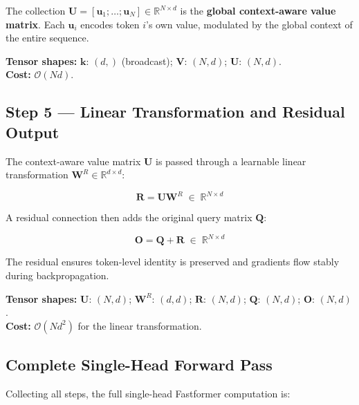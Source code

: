 \documentclass[11pt,a4paper]{article}
\newcommand{\mat}[1]{\mathbf{#1}}
\newcommand{\vect}[1]{\mathbf{#1}}
\newcommand{\R}{\mathbb{R}}
\theoremstyle{definition}
\begin{document}
The collection $\mat{U}=[\vect{u}_1;\ldots;\vect{u}_N]\in\R^{N\times d}$ is the
\textbf{global context-aware value matrix}.
Each $\vect{u}_i$ encodes token $i$'s own value, modulated by the global context of the
entire sequence.

\noindent \textbf{Tensor shapes:} $\vect{k}:\,(d,)$ (broadcast);\; $\mat{V}:\,(N,d)$;\;
$\mat{U}:\,(N,d)$.\\
\textbf{Cost:} $\mathcal{O}(Nd)$.

\subsection{Step 5 --- Linear Transformation and Residual Output}
\label{sec:output}

The context-aware value matrix $\mat{U}$ is passed through a learnable linear transformation
$\mat{W}^{R}\in\R^{d\times d}$:

\begin{equation*}
  \mat{R} = \mat{U}\mat{W}^{R} \;\in\; \R^{N\times d}
\end{equation*}

A residual connection then adds the original query matrix $\mat{Q}$:

\begin{equation*}
  \mat{O} = \mat{Q} + \mat{R} \;\in\; \R^{N\times d}
\end{equation*}

The residual ensures token-level identity is preserved and gradients flow stably during
backpropagation.

\noindent \textbf{Tensor shapes:} $\mat{U}:\,(N,d)$;\; $\mat{W}^{R}:\,(d,d)$;\;
$\mat{R}:\,(N,d)$;\; $\mat{Q}:\,(N,d)$;\; $\mat{O}:\,(N,d)$.\\
\textbf{Cost:} $\mathcal{O}(Nd^{2})$ for the linear transformation.

\subsection{Complete Single-Head Forward Pass}
\label{sec:full_pass}

Collecting all steps, the full single-head Fastformer computation is:
\end{document}
